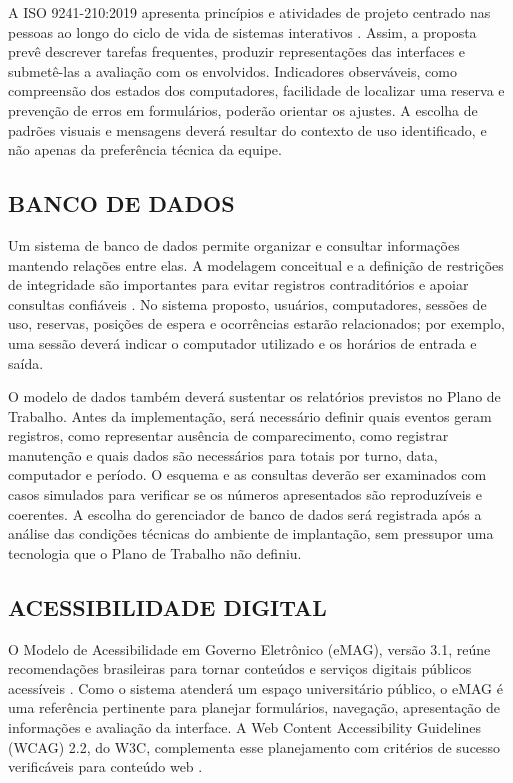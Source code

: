 \documentclass[12pt,a4paper]{article}
\begin{document}
A ISO 9241-210:2019 apresenta princípios e atividades de projeto centrado nas pessoas ao longo do ciclo de vida de sistemas interativos \cite{iso9241_210_2019}. Assim, a proposta prevê descrever tarefas frequentes, produzir representações das interfaces e submetê-las a avaliação com os envolvidos. Indicadores observáveis, como compreensão dos estados dos computadores, facilidade de localizar uma reserva e prevenção de erros em formulários, poderão orientar os ajustes. A escolha de padrões visuais e mensagens deverá resultar do contexto de uso identificado, e não apenas da preferência técnica da equipe.

\subsection{BANCO DE DADOS}

Um sistema de banco de dados permite organizar e consultar informações mantendo relações entre elas. A modelagem conceitual e a definição de restrições de integridade são importantes para evitar registros contraditórios e apoiar consultas confiáveis \cite{silberschatz2019}. No sistema proposto, usuários, computadores, sessões de uso, reservas, posições de espera e ocorrências estarão relacionados; por exemplo, uma sessão deverá indicar o computador utilizado e os horários de entrada e saída.

O modelo de dados também deverá sustentar os relatórios previstos no Plano de Trabalho. Antes da implementação, será necessário definir quais eventos geram registros, como representar ausência de comparecimento, como registrar manutenção e quais dados são necessários para totais por turno, data, computador e período. O esquema e as consultas deverão ser examinados com casos simulados para verificar se os números apresentados são reproduzíveis e coerentes. A escolha do gerenciador de banco de dados será registrada após a análise das condições técnicas do ambiente de implantação, sem pressupor uma tecnologia que o Plano de Trabalho não definiu.

\subsection{ACESSIBILIDADE DIGITAL}

O Modelo de Acessibilidade em Governo Eletrônico (eMAG), versão 3.1, reúne recomendações brasileiras para tornar conteúdos e serviços digitais públicos acessíveis \cite{emag2014}. Como o sistema atenderá um espaço universitário público, o eMAG é uma referência pertinente para planejar formulários, navegação, apresentação de informações e avaliação da interface. A Web Content Accessibility Guidelines (WCAG) 2.2, do W3C, complementa esse planejamento com critérios de sucesso verificáveis para conteúdo web \cite{wcag22_2024}.
\end{document}
